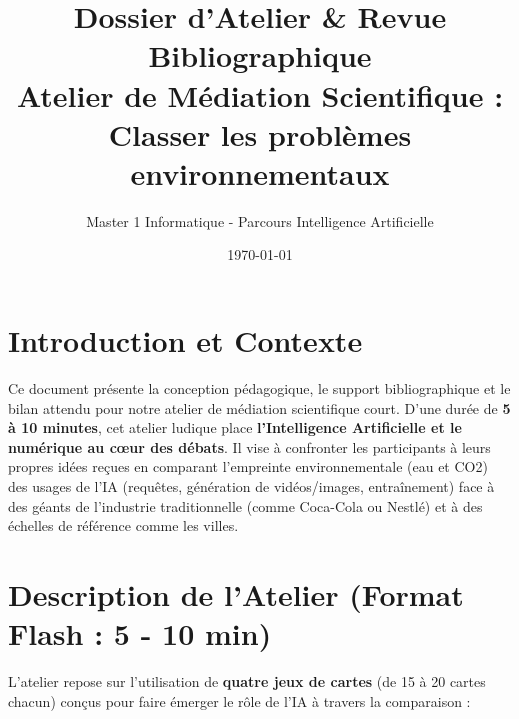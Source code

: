 \documentclass[11pt, a4paper]{article}
\title{\textbf{Dossier d'Atelier \& Revue Bibliographique}\\ \Large Atelier de Médiation Scientifique : \og Classer les problèmes environnementaux \fg{}}
\author{Master 1 Informatique - Parcours Intelligence Artificielle}
\date{\today}
\begin{document}
\maketitle

\section*{Introduction et Contexte}
Ce document présente la conception pédagogique, le support bibliographique et le bilan attendu pour notre atelier de médiation scientifique court. D'une durée de \textbf{5 à 10 minutes}, cet atelier ludique place \textbf{l'Intelligence Artificielle et le numérique au cœur des débats}. Il vise à confronter les participants à leurs propres idées reçues en comparant l'empreinte environnementale (eau et CO2) des usages de l'IA (requêtes, génération de vidéos/images, entraînement) face à des géants de l'industrie traditionnelle (comme Coca-Cola ou Nestlé) et à des échelles de référence comme les villes.

\vspace{0.5cm}

\section{Description de l'Atelier (Format Flash : 5 - 10 min)}

L'atelier repose sur l'utilisation de \textbf{quatre jeux de cartes} (de 15 à 20 cartes chacun) conçus pour faire émerger le rôle de l'IA à travers la comparaison :
\end{document}
